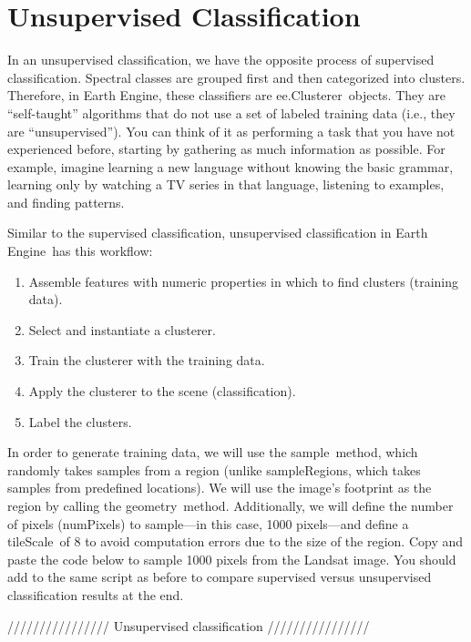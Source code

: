 \documentclass[
  letterpaper,
  DIV=11,
  numbers=noendperiod]{scrreprt}
\providecommand{\tightlist}{%
  \setlength{\itemsep}{0pt}\setlength{\parskip}{0pt}}\usepackage{longtable,booktabs,array}
\begin{document}
\hypertarget{unsupervised-classification}{%
\section{Unsupervised
Classification}\label{unsupervised-classification}}

In an unsupervised classification, we have the opposite process of
supervised classification. Spectral classes are grouped first and then
categorized into clusters. Therefore, in Earth Engine, these classifiers
are ee.Clusterer~objects. They are ``self-taught'' algorithms that do
not use a set of labeled training data (i.e., they are
``unsupervised''). You can think of it as performing a task that you
have not experienced before, starting by gathering as much information
as possible. For example, imagine learning a new language without
knowing the basic grammar, learning only by watching a TV series in that
language, listening to examples, and finding patterns.

Similar to the supervised classification, unsupervised classification in
Earth Engine~has this workflow:

\begin{enumerate}
\def\labelenumi{\arabic{enumi}.}
\tightlist
\item
  Assemble features with numeric properties in which to find clusters
  (training data).
\item
  Select and instantiate a clusterer.
\item
  Train the clusterer with the training data.
\item
  Apply the clusterer to the scene (classification).
\item
  Label the clusters.
\end{enumerate}

In order to generate training data, we will use the sample~method, which
randomly takes samples from a region (unlike sampleRegions, which takes
samples from predefined locations). We will use the image's footprint as
the region by calling the geometry~method. Additionally, we will define
the number of pixels (numPixels) to sample---in this case, 1000
pixels---and define a tileScale~of 8 to avoid computation errors due to
the size of the region. Copy and paste the code below to sample 1000
pixels from the Landsat image. You should add to the same script as
before to compare supervised versus unsupervised classification results
at the end.

//////////////// Unsupervised classification ////////////////
\end{document}
